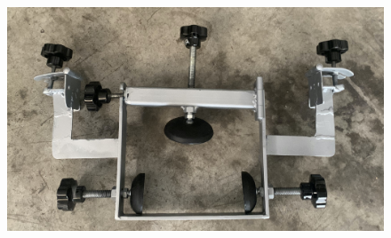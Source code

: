 \documentclass[binding=0.6cm,LaM,noexaminfo]{sapthesis}
\begin{document}
\newpage
\begin{figure}[!htp]
    \centering
    \includegraphics[width=\textwidth]{images/finished_project/IMG_3684.jpg}
\end{figure}
\end{document}
